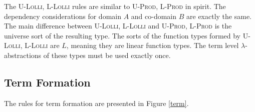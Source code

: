 \documentclass[sigplan,screen]{acmart}
\theoremstyle{definition}
\newcommand{\rname}[1]{\textsc{\footnotesize #1}}
\begin{document}
  The \rname{U-Lolli}, \rname{L-Lolli} rules are similar to \rname{U-Prod}, \rname{L-Prod} in spirit. The dependency considerations for domain $A$ and co-domain $B$ are exactly the same. The main difference between \rname{U-Lolli}, \rname{L-Lolli} and \rname{U-Prod}, \rname{L-Prod} is the universe sort of the resulting type. The sorts of the function types formed by \rname{U-Lolli}, \rname{L-Lolli} are $L$, meaning they are linear function types. The term level $\lambda$-abstractions of these types must be used exactly once.

  \subsection{Term Formation} \label{teformation}
  The rules for term formation are presented in Figure \ref{term}.
\end{document}
